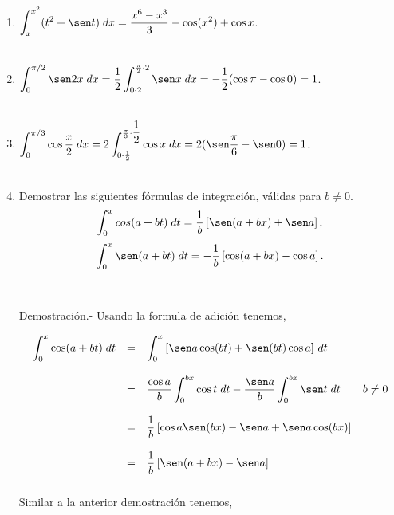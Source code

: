 \begin{enumerate}[\bfseries 1.]
\item $\displaystyle\int_{x}^{x^2}(t^2+\sen t)\; dx = \dfrac{x^6-x^3}{3} - \cos (x^2) + \cos x$.\\\\

\item $\displaystyle\int_0^{\pi/2} \sen 2 x\; dx = \dfrac{1}{2}\int_{0\cdot 2}^{\frac{\pi}{2}\cdot 2}  \sen x\; dx = -\dfrac{1}{2}(\cos \pi -\cos 0) = 1$.\\\\

\item $\displaystyle\int_0^{\pi/3} \cos \dfrac{x}{2}\; dx =2 \int_{0\cdot \frac{1}{2}}^{\frac{\pi}{3}\cdot \dfrac{1}{2}}\cos x \; dx = 2 (\sen \dfrac{\pi}{6} - \sen 0) = 1$.\\\\


\item Demostrar las siguientes fórmulas de integración, válidas para $b\neq 0$.
    $$\int_0^x cos(a+bt)\; dt = \dfrac{1}{b}\left[\sen(a+bx)+\sen a\right],$$
    $$\int_0^x \sen (a+bt)\; dt = -\dfrac{1}{b} \left[\cos(a+bx)-\cos a\right].$$\\\\
	Demostración.-\; Usando la formula de adición tenemos,

	$$\begin{array}{rcl}
	    \displaystyle\int_0^x \cos(a+bt)\; dt&=&\displaystyle\int_0^x \left[\sen a \cos(bt)+\sen(bt)\cos a\right]\, dt\\\\
						 &=&\dfrac{\cos a}{b} \displaystyle\int_0^{bx} \cos t \; dt  - \dfrac{\sen a}{b} \displaystyle\int_0^{bx} \sen t \; dt \qquad b\neq 0\\\\
						 &=&\dfrac{1}{b}\left[\cos a \sen(bx)-\sen a + \sen a \cos(bx)\right]\\\\
						 &=&\dfrac{1}{b}\left[\sen(a+bx)-\sen a\right]\\\\

	\end{array}$$
	Similar a la anterior demostración tenemos, \\


\end{enumerate}
